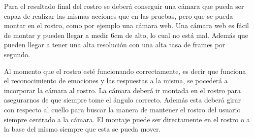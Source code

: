 Para el resultado final del rostro se deberá conseguir una cámara que pueda ser capaz de realizar las mismas acciones que en las pruebas, pero que se pueda montar en el rostro, como por ejemplo una cámara web. Una cámara web es fácil de montar y pueden llegar a medir 6cm de alto, lo cual no está mal. Además que pueden llegar a tener una alta resolución con una alta tasa de frames por segundo.

Al momento que el rostro esté funcionando correctamente, es decir que funciona el reconocimiento de emociones y las respuestas a la misma, se pocederá a incorporar la cámara al rostro. La cámara deberá ir montada en el rostro para asegurarnos de que siempre tome el ángulo correcto. Además esta deberá girar con respecto al cuello para buscar la manera de mantener el rostro del usuario siempre centrado a la cámara. El montaje puede ser directamente en el rostro o a la base del mismo siempre que esta se pueda mover.